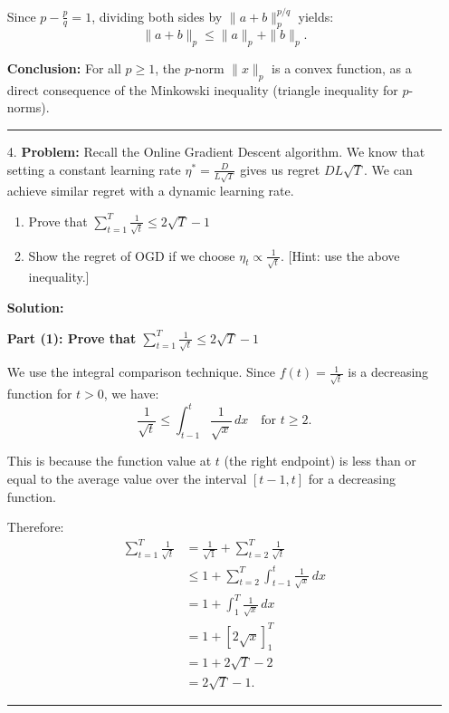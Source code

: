 \documentclass[12pt,letterpaper]{article}
\newenvironment{proof}{\noindent{\bf Proof:}}{\qed\bigskip}
\newcommand{\qed}{\rule{7pt}{7pt}}
\begin{document}
\begin{enumerate}
\begin{proof}
Since $p - \frac{p}{q} = 1$, dividing both sides by $\|a+b\|_p^{p/q}$ yields:
\[
\|a + b\|_p \leq \|a\|_p + \|b\|_p.
\]

\bigskip

\textbf{Conclusion:} For all $p \geq 1$, the $p$-norm $\|x\|_p$ is a convex function, as a direct consequence of the Minkowski inequality (triangle inequality for $p$-norms).

\end{proof}
	
	\item[4.]
\textbf{Problem:} Recall the Online Gradient Descent algorithm. We know that setting a constant learning rate $\eta^* = \frac{D}{L\sqrt{T}}$ gives us regret $DL\sqrt{T}$. We can achieve similar regret with a dynamic learning rate.

\begin{enumerate}
    \item Prove that $\sum_{t=1}^{T}\frac{1}{\sqrt{t}} \leq 2\sqrt{T} - 1$
    \item Show the regret of OGD if we choose $\eta_t \propto \frac{1}{\sqrt{t}}$. [Hint: use the above inequality.]
\end{enumerate}

\bigskip

\textbf{Solution:}

\bigskip

\textbf{Part (1): Prove that $\displaystyle\sum_{t=1}^{T}\frac{1}{\sqrt{t}} \leq 2\sqrt{T} - 1$}

\begin{proof}
We use the integral comparison technique. Since $f(t) = \frac{1}{\sqrt{t}}$ is a decreasing function for $t > 0$, we have:
\[
\frac{1}{\sqrt{t}} \leq \int_{t-1}^{t} \frac{1}{\sqrt{x}}\, dx \quad \text{for } t \geq 2.
\]

This is because the function value at $t$ (the right endpoint) is less than or equal to the average value over the interval $[t-1, t]$ for a decreasing function.

Therefore:
\begin{align*}
\sum_{t=1}^{T}\frac{1}{\sqrt{t}} &= \frac{1}{\sqrt{1}} + \sum_{t=2}^{T}\frac{1}{\sqrt{t}} \\
&\leq 1 + \sum_{t=2}^{T}\int_{t-1}^{t}\frac{1}{\sqrt{x}}\, dx \\
&= 1 + \int_{1}^{T}\frac{1}{\sqrt{x}}\, dx \\
&= 1 + \left[2\sqrt{x}\right]_{1}^{T} \\
&= 1 + 2\sqrt{T} - 2 \\
&= 2\sqrt{T} - 1.
\end{align*}


\end{proof}
\end{enumerate}
\end{document}
